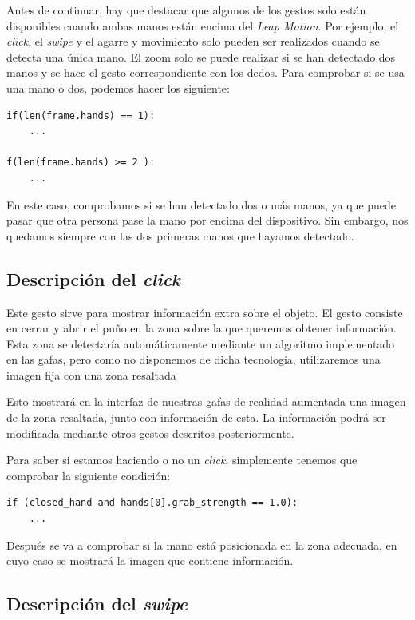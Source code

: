 \documentclass[11pt,a4paper]{article}
\begin{document}
Antes de continuar, hay que destacar que algunos de los gestos solo están disponibles
cuando ambas manos están encima del \textit{Leap Motion}. Por ejemplo, el \textit{click},
el \textit{swipe} y el agarre y movimiento solo pueden ser realizados cuando se detecta
una única mano. El zoom solo se puede realizar si se han detectado dos manos y se hace
el gesto correspondiente con los dedos. Para comprobar si se usa una mano o dos, podemos
hacer los siguiente:

\begin{lstlisting}
if(len(frame.hands) == 1):
	...

f(len(frame.hands) >= 2 ):
	...
\end{lstlisting}

En este caso, comprobamos si se han detectado dos o más manos, ya que puede pasar que
otra persona pase la mano por encima del dispositivo. Sin embargo, nos quedamos siempre
con las dos primeras manos que hayamos detectado.

\subsection{Descripción del \textit{click}}

Este gesto sirve para mostrar información extra sobre el objeto. El gesto consiste en cerrar y abrir el puño en la zona sobre la que
queremos obtener información. Esta zona se detectaría automáticamente mediante un algoritmo implementado en las gafas, pero como no disponemos
de dicha tecnología, utilizaremos una imagen fija con una zona resaltada

Esto mostrará en la interfaz de nuestras gafas de realidad aumentada una imagen de la zona resaltada, junto con información de esta. La
información podrá ser modificada mediante otros gestos descritos posteriormente.

Para saber si estamos haciendo o no un \textit{click}, simplemente tenemos que
comprobar la siguiente condición:

\begin{lstlisting}
if (closed_hand and hands[0].grab_strength == 1.0):
	...
\end{lstlisting}

Después se va a comprobar si la mano está posicionada en la zona adecuada, en cuyo caso se
mostrará la imagen que contiene información.

\subsection{Descripción del \textit{swipe}}
\end{document}
